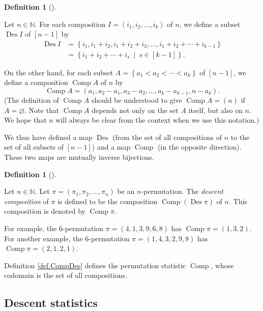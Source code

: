 \documentclass[numbers=enddot,12pt,final,onecolumn,notitlepage]{scrartcl}%
\theoremstyle{definition}
\newtheorem{defi}[theo]{Definition}
\newenvironment{definition}[1][]
{\begin{defi}[#1]\begin{leftbar}}
{\end{leftbar}\end{defi}}
\begin{document}
\begin{definition}
\label{def.comps-to-sets}Let $n\in\mathbb{N}$. For each composition $I=\left(
i_{1},i_{2},\ldots,i_{k}\right)  $ of $n$, we define a subset
$\operatorname*{Des}I$ of $\left[  n-1\right]  $ by%
\begin{align*}
\operatorname*{Des}I  &  =\left\{  i_{1},i_{1}+i_{2},i_{1}+i_{2}+i_{3}%
,\ldots,i_{1}+i_{2}+\cdots+i_{k-1}\right\} \\
&  =\left\{  i_{1}+i_{2}+\cdots+i_{s}\ \mid\ s\in\left[  k-1\right]  \right\}
.
\end{align*}


On the other hand, for each subset $A=\left\{  a_{1}<a_{2}<\cdots
<a_{k}\right\}  $ of $\left[  n-1\right]  $, we define a composition
$\operatorname*{Comp}A$ of $n$ by%
\[
\operatorname*{Comp}A=\left(  a_{1},a_{2}-a_{1},a_{3}-a_{2},\ldots
,a_{k}-a_{k-1},n-a_{k}\right)  .
\]
(The definition of $\operatorname*{Comp}A$ should be understood to give
$\operatorname*{Comp}A=\left(  n\right)  $ if $A=\varnothing$. Note that
$\operatorname*{Comp}A$ depends not only on the set $A$ itself, but also on
$n$. We hope that $n$ will always be clear from the context when we use this notation.)

We thus have defined a map $\operatorname*{Des}$ (from the set of all
compositions of $n$ to the set of all subsets of $\left[  n-1\right]  $) and a
map $\operatorname*{Comp}$ (in the opposite direction). These two maps are
mutually inverse bijections.
\end{definition}

\begin{definition}
\label{def.CompDes}Let $n\in\mathbb{N}$. Let $\pi=\left(  \pi_{1},\pi
_{2},\ldots,\pi_{n}\right)  $ be an $n$-permutation. The \textit{descent
composition} of $\pi$ is defined to be the composition $\operatorname*{Comp}%
\left(  \operatorname*{Des}\pi\right)  $ of $n$. This composition is denoted
by $\operatorname*{Comp}\pi$.
\end{definition}

For example, the $6$-permutation $\pi=\left(  4,1,3,9,6,8\right)  $ has
$\operatorname*{Comp}\pi=\left(  1,3,2\right)  $. For another example, the
$6$-permutation $\pi=\left(  1,4,3,2,9,8\right)  $ has $\operatorname*{Comp}%
\pi=\left(  2,1,2,1\right)  $.

Definition \ref{def.CompDes} defines the permutation statistic
$\operatorname*{Comp}$, whose codomain is the set of all compositions.

\subsection{Descent statistics}
\end{document}
